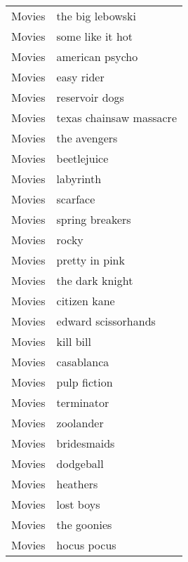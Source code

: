 \begin{supertabular}{l p{0.25\textwidth}}
           Movies &                   the big lebowski \\
           Movies &                   some like it hot \\
           Movies &                    american psycho \\
           Movies &                         easy rider \\
           Movies &                     reservoir dogs \\
           Movies &            texas chainsaw massacre \\
           Movies &                       the avengers \\
           Movies &                        beetlejuice \\
           Movies &                          labyrinth \\
           Movies &                           scarface \\
           Movies &                    spring breakers \\
           Movies &                              rocky \\
           Movies &                     pretty in pink \\
           Movies &                    the dark knight \\
           Movies &                       citizen kane \\
           Movies &                edward scissorhands \\
           Movies &                          kill bill \\
           Movies &                         casablanca \\
           Movies &                       pulp fiction \\
           Movies &                         terminator \\
           Movies &                          zoolander \\
           Movies &                        bridesmaids \\
           Movies &                          dodgeball \\
           Movies &                           heathers \\
           Movies &                          lost boys \\
           Movies &                        the goonies \\
           Movies &                        hocus pocus \\

\end{supertabular}
